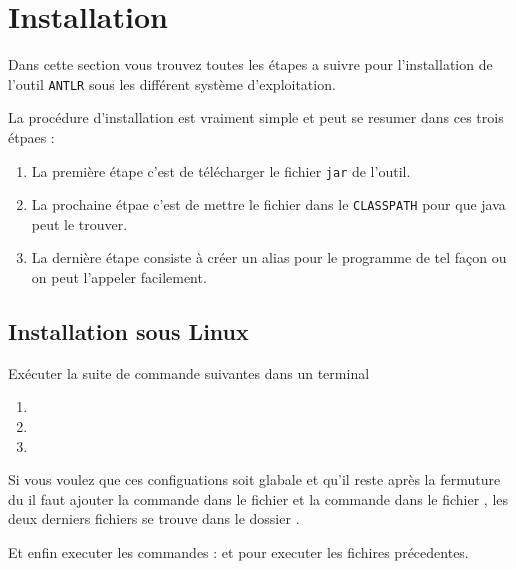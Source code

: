 \documentclass[12pt]{article}
\begin{document}
\def\reportnumber{1}
\def\reporttitle{Introduction au \texttt{ANTLR}}

\section{Installation}
Dans cette section vous trouvez toutes les étapes a suivre pour l'installation de l'outil \texttt{ANTLR} sous les différent système d'exploitation.

La procédure d'installation est vraiment simple et peut se resumer dans ces trois étpaes : 
\begin{enumerate}
    \item La première étape c'est de télécharger le fichier \texttt{jar} de l'outil.
    \item La prochaine étpae c'est de mettre le fichier dans le \texttt{CLASSPATH} pour que java peut le trouver. 
    \item La dernière étape consiste à créer un alias pour le programme de tel façon ou on peut l'appeler facilement.
\end{enumerate}



\subsection{Installation sous Linux}
Exécuter la suite de commande suivantes dans un terminal 

\begin{enumerate}
    \item 

    \item {}
    \item {}

\end{enumerate}

Si vous voulez que ces configuations soit glabale et qu'il reste après la fermuture du  il faut ajouter la commande  dans le fichier  et la commande  dans le fichier , les deux derniers fichiers se trouve dans le dossier . 

Et enfin executer les commandes :  et  pour executer les fichires précedentes.
\end{document}
